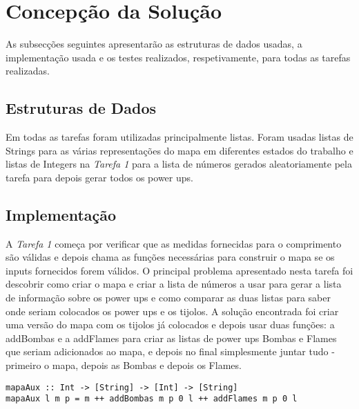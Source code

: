 \documentclass[a4paper]{article}
\begin{document}
\section{Concepção da Solução}
\label{sec:solucao}

As subsecções seguintes apresentarão as estruturas de dados usadas, 
a implementação usada e os testes realizados, respetivamente, para 
todas as tarefas realizadas.

\subsection{Estruturas de Dados}

Em todas as tarefas foram utilizadas principalmente listas. Foram 
usadas listas de Strings para as várias representações do mapa em 
diferentes estados do trabalho e listas de Integers na \emph{Tarefa 1}
para a lista de números gerados aleatoriamente pela tarefa para 
depois gerar todos os power ups. 

\subsection{Implementação}

A \emph{Tarefa 1} começa por verificar que as medidas fornecidas 
para o comprimento são válidas e depois chama as funções necessárias 
para construir o mapa se os inputs fornecidos forem válidos. O 
principal problema apresentado nesta tarefa foi descobrir como 
criar o mapa e criar a lista de números a usar para gerar a lista
de informação sobre os power ups e como comparar as duas listas 
para saber onde seriam colocados os power ups e os tijolos.
A solução encontrada foi criar uma versão do mapa com os tijolos 
já colocados e depois usar duas funções: a addBombas e a addFlames 
para criar as listas de power ups Bombas e Flames que seriam adicionados
ao mapa, e depois no final simplesmente juntar tudo - primeiro o mapa, 
depois as Bombas e depois os Flames.
\begin{verbatim}
mapaAux :: Int -> [String] -> [Int] -> [String] 
mapaAux l m p = m ++ addBombas m p 0 l ++ addFlames m p 0 l
\end{verbatim}
\end{document}
